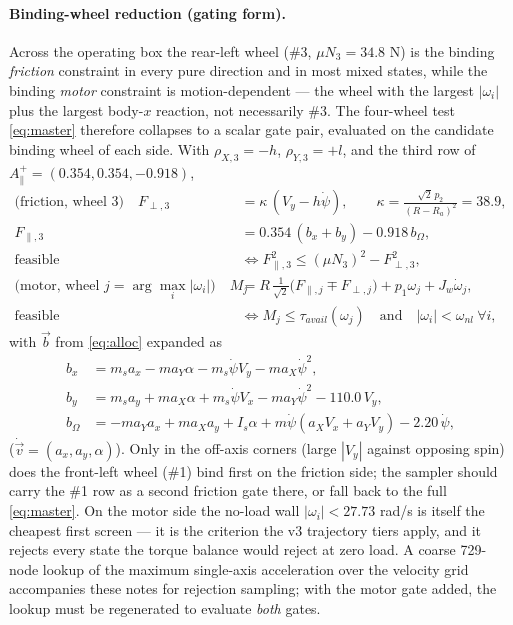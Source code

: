 \documentclass[11pt]{article}
\begin{document}
\paragraph{Binding-wheel reduction (gating form).} Across the operating box the rear-left wheel
(\#3, $\mu N_3=34.8$ N) is the binding \emph{friction} constraint in every pure direction and in
most mixed states, while the binding \emph{motor} constraint is motion-dependent --- the wheel with
the largest $|\omega_i|$ plus the largest body-$x$ reaction, not necessarily \#3. The four-wheel
test \eqref{eq:master} therefore collapses to a scalar gate pair, evaluated on the candidate
binding wheel of each side. With $\rho_{X,3}=-h$, $\rho_{Y,3}=+l$, and the third row of
$A_\parallel^{+}=(0.354,0.354,-0.918)$,
\begin{align}
\text{(friction, wheel 3)}\quad
F_{\perp,3}&=\kappa\,(V_y-h\dot\psi),\qquad \kappa=\frac{\sqrt2\,p_2}{(R-R_a)^2}=38.9,\\
F_{\parallel,3}&=0.354\,(b_x+b_y)-0.918\,b_\Omega,\\
\text{feasible}&\iff F_{\parallel,3}^2\le(\mu N_3)^2-F_{\perp,3}^2,\\[4pt]
\text{(motor, wheel } j=\arg\max_i|\omega_i|\text{)}\quad
M_j&=R\,\tfrac{1}{\sqrt2}\big(F_{\parallel,j}\mp F_{\perp,j}\big)+p_1\omega_j+J_w\dot\omega_j,\\
\text{feasible}&\iff M_j\le\tau_{avail}(\omega_j)
\quad\text{and}\quad |\omega_i|<\omega_{nl}\ \forall i,
\end{align}
with $\vec b$ from \eqref{eq:alloc} expanded as
\begin{align}
b_x&=m_s a_x-ma_Y\alpha-m_s\dot\psi V_y-ma_X\dot\psi^2,\\
b_y&=m_s a_y+ma_X\alpha+m_s\dot\psi V_x-ma_Y\dot\psi^2-110.0\,V_y,\\
b_\Omega&=-ma_Y a_x+ma_X a_y+I_s\alpha+m\dot\psi(a_XV_x+a_YV_y)-2.20\,\dot\psi,
\end{align}
($\dot{\vec v}=(a_x,a_y,\alpha)$). Only in the off-axis corners (large $|V_y|$ against opposing
spin) does the front-left wheel (\#1) bind first on the friction side; the sampler should carry
the \#1 row as a second friction gate there, or fall back to the full \eqref{eq:master}. On the
motor side the no-load wall $|\omega_i|<27.73$ rad/s is itself the cheapest first screen ---
it is the criterion the v3 trajectory tiers apply, and it rejects every state the torque
balance would reject at zero load. A coarse 729-node lookup of the maximum
single-axis acceleration over the velocity grid accompanies these notes for rejection sampling;
with the motor gate added, the lookup must be regenerated to evaluate \emph{both} gates.
\end{document}
